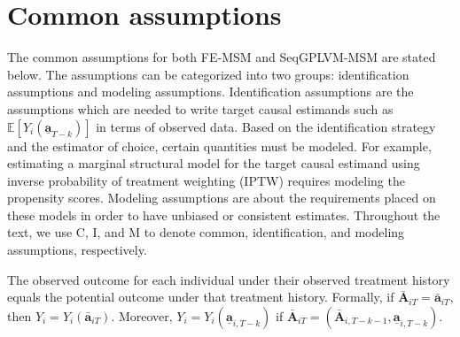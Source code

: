 \section{Common assumptions}
\label{sec:assumptions}
The common assumptions for both FE-MSM and SeqGPLVM-MSM are stated below. 
The assumptions can be categorized into two groups: identification assumptions and 
modeling assumptions. Identification assumptions 
are the assumptions which are needed to write target causal estimands such as 
$\mathbb{E}[Y_i(\underline{\mathbf{a}}_{T-k})]$ in terms of observed data. 
Based on the identification strategy and the estimator of choice, 
certain quantities must be modeled. 
For example, estimating a marginal structural model for the target causal estimand using 
inverse probability of treatment weighting (IPTW) requires modeling the 
propensity scores. Modeling assumptions are about the 
requirements placed on these models in order to have unbiased or consistent estimates. 
Throughout the text, 
we use C, I, and M to denote common, identification, and modeling 
assumptions, respectively.

\begin{idassumpC}[Consistency]\label{ass:C-consistency}
The observed outcome for each individual under their observed treatment history equals
the potential outcome under that treatment history. Formally, if $\bar{\mathbf{A}}_{iT}=\bar{\mathbf{a}}_{iT}$, 
then $Y_{i}=Y_{i}(\bar{\mathbf{a}}_{iT})$. 
Moreover, $Y_{i} = Y_{i}(\underline{\mathbf{a}}_{i,T-k})$ if 
$\bar{\mathbf{A}}_{iT}=\left(\bar{\mathbf{A}}_{i,T-k-1},\underline{\mathbf{a}}_{i,T-k}\right)$.
\end{idassumpC}

